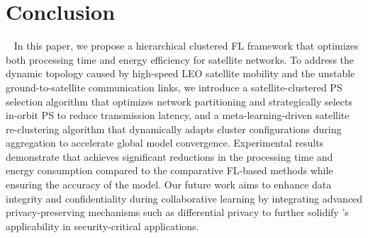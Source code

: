 \section{Conclusion}~\label{sec:conclusion}
In this paper, we propose a hierarchical clustered FL framework \algname that optimizes both processing time and energy efficiency for satellite networks. To address the dynamic topology caused by high-speed LEO satellite mobility and the unstable ground-to-satellite communication links, we introduce a satellite-clustered PS selection algorithm that optimizes network partitioning and strategically selects in-orbit PS to reduce transmission latency, and a meta-learning-driven satellite re-clustering algorithm that dynamically adapts cluster configurations during aggregation to accelerate global model convergence. Experimental results demonstrate that \algname achieves significant reductions in the processing time and energy consumption compared to the comparative FL-based methods while ensuring the accuracy of the model. Our future work aims to enhance data integrity and confidentiality during collaborative learning by integrating advanced privacy-preserving mechanisms such as differential privacy to further solidify \algname’s applicability in security-critical applications.








